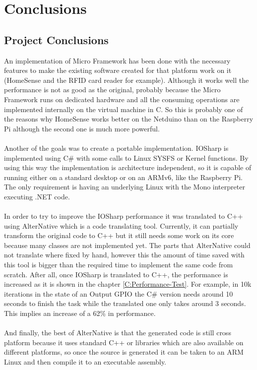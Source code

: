 \chapter{Conclusions}\label{C:Conclusions}
\section{Project Conclusions}\label{S:Project-Conclusions}
An implementation of Micro Framework has been done with the necessary features to make the existing software created for that platform work on it (HomeSense and the RFID card reader for example). Although it works well the performance is not as good as the original, probably because the Micro Framework runs on dedicated hardware and all the consuming operations are implemented internally on the virtual machine in C. So this is probably one of the reasons why HomeSense works better on the Netduino than on the Raspberry Pi although the second one is much more powerful.
\\
\\
Another of the goals was to create a portable implementation. IOSharp is implemented using C\# with some calls to Linux SYSFS or Kernel functions. By using this way the implementation is architecture independent, so it is capable of running either on a standard desktop or on an ARMv6, like the Raspberry Pi. The only requirement is having an underlying Linux with the Mono interpreter executing .NET code.
\\
\\
In order to try to improve the IOSharp performance it was translated to C++ using AlterNative which is a code translating tool. Currently, it can partially transform the original code to C++ but it still needs some work on its core because many classes are not implemented yet. The parts that AlterNative could not translate where fixed by hand, however this the amount of time saved with this tool is bigger than the required time to implement the same code from scratch. After all, once IOSharp is translated to C++, the performance is increased as it is shown in the chapter \ref{C:Performance-Test}. For example, in 10k iterations in the state of an Output GPIO the C\# version needs around 10 seconds to finish the task while the translated one only takes around 3 seconds. This implies an increase of a 62\% in performance.
\\
\\
And finally, the best of AlterNative is that the generated code is still cross platform because it uses standard C++ or libraries which are also available on different platforms, so once the source is generated it can be taken to an ARM Linux and then compile it to an executable assembly.

